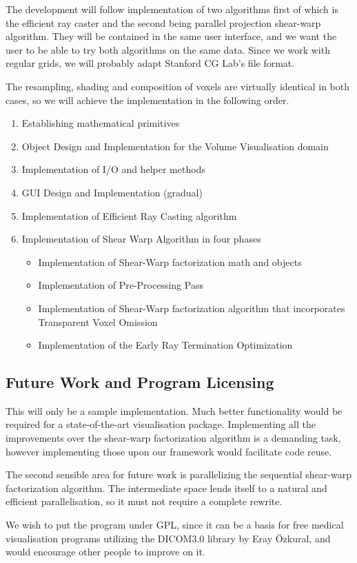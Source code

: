 \documentclass[a4paper,12pt]{article}
\begin{document}
The development will follow implementation of two algorithms first of
which is the efficient ray caster and the second being parallel
projection shear-warp algorithm. They will be contained in the same
user interface, and we want the user to be able to try both algorithms
on the same data. Since we work with regular grids, we will probably adapt
Stanford CG Lab's file format.

The resampling, shading and composition of voxels are virtually
identical in both cases, so we will achieve the implementation in the
following order.
\begin{enumerate}
\item Establishing mathematical primitives
\item Object Design and Implementation for the Volume Visualisation domain
\item Implementation of I/O and helper methods
\item GUI Design and Implementation (gradual)
\item Implementation of Efficient Ray Casting algorithm
\item Implementation of Shear Warp Algorithm in four phases
  \begin{itemize}
   \item Implementation of Shear-Warp factorization math and objects
   \item Implementation of Pre-Processing Pass
   \item Implementation of Shear-Warp factorization algorithm that
     incorporates Transparent Voxel Omission
   \item Implementation of the Early Ray Termination Optimization
  \end{itemize}
\end{enumerate}

\subsection{Future Work and Program Licensing}

This will only be a sample implementation. Much better functionality would be
required for a state-of-the-art visualisation package. Implementing
all the improvements over the shear-warp factorization algorithm is a
demanding task, however implementing those upon our framework would
facilitate code reuse.

The second sensible area for future work is parallelizing the
sequential shear-warp factorization algorithm. The intermediate space
lends itself to a natural and efficient parallelisation, so it must
not require a complete rewrite.

We wish to put the program under GPL, since it can be a basis for
free medical visualisation programs utilizing the DICOM3.0 library by
Eray \"Ozkural, and would encourage other people to improve on it.
\end{document}
